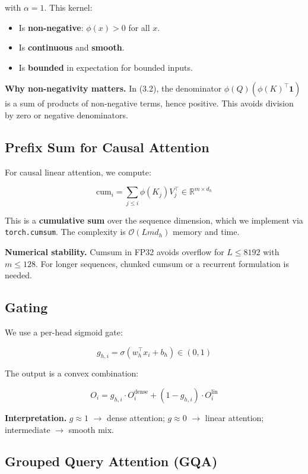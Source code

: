 with $\alpha = 1$. This kernel:

\begin{itemize}
\item Is \textbf{non-negative}: $\phi(x) > 0$ for all $x$.
\item Is \textbf{continuous} and \textbf{smooth}.
\item Is \textbf{bounded} in expectation for bounded inputs.

\end{itemize}
\textbf{Why non-negativity matters.} In (3.2), the denominator 
$\phi(Q) (\phi(K)^\top \mathbf{1})$ is a sum of products of non-negative 
terms, hence positive. This avoids division by zero or negative denominators.

\subsection{Prefix Sum for Causal Attention}

For causal linear attention, we compute:

\[
\text{cum}_i = \sum_{j \le i} \phi(K_j) V_j^\top \in \mathbb{R}^{m \times d_h}
\]

This is a \textbf{cumulative sum} over the sequence dimension, which we implement 
via \texttt{torch.cumsum}. The complexity is $\mathcal{O}(L m d_h)$ memory and time.

\textbf{Numerical stability.} Cumsum in FP32 avoids overflow for $L \le 8192$ 
with $m \le 128$. For longer sequences, chunked cumsum or a recurrent 
formulation is needed.

\subsection{Gating}

We use a per-head sigmoid gate:

\[
g_{h,i} = \sigma\!\left(w_h^\top x_i + b_h\right) \in (0, 1)
\]

The output is a convex combination:

\[
O_i = g_{h,i} \cdot O_i^\text{dense} + (1 - g_{h,i}) \cdot O_i^\text{lin}
\]

\textbf{Interpretation.} $g \approx 1$ $\to$ dense attention; $g \approx 0$ $\to$ linear 
attention; intermediate $\to$ smooth mix.

\subsection{Grouped Query Attention (GQA)}

